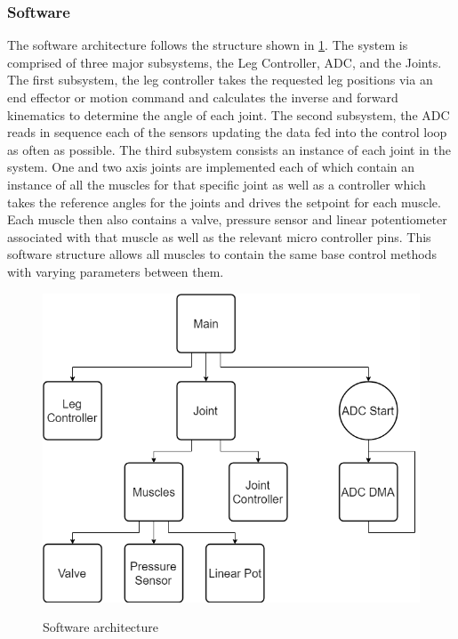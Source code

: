 \documentclass[11pt,a4paper]{article}
\begin{document}
\subsubsection{Software}
\label{sub:software}
The software architecture follows the structure shown in \cref{fig:software_arch}. The system is comprised of three major subsystems, the Leg Controller, ADC, and the Joints. The first subsystem, the leg controller takes the requested leg positions via an end effector or motion command and calculates the inverse and forward kinematics to determine the angle of each joint. The second subsystem, the ADC reads in sequence each of the sensors updating the data fed into the control loop as often as possible. The third subsystem consists an instance of each joint in the system. One and two axis joints are implemented each of which contain an instance of all the muscles for that specific joint as well as a controller which takes the reference angles for the joints and drives the setpoint for each muscle. Each muscle then also contains a valve, pressure sensor and linear potentiometer associated with that muscle as well as the relevant micro controller pins. This software structure allows all muscles to contain the same base control methods with varying parameters between them.

\begin{figure}[hbt!]
    \centering
    \caption{Software architecture}
    \includegraphics[scale=0.5]{Software_Arch.png}
    \label{fig:software_arch}
\end{figure}
\end{document}
